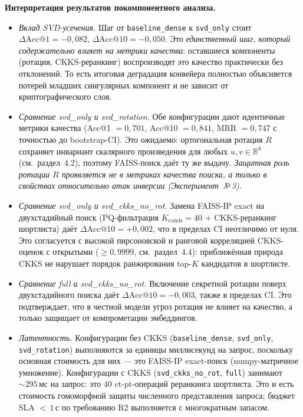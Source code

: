 \documentclass[a4paper, 12pt, oneside, openany]{article}
\begin{document}
\textbf{Интерпретация результатов покомпонентного анализа.}

\begin{itemize}
	\item \emph{Вклад SVD-усечения.} Шаг от \texttt{baseline\_dense} к \texttt{svd\_only} стоит $\Delta\mathrm{Acc@1} = -0{,}082$, $\Delta\mathrm{Acc@10} = -0{,}050$. Это \emph{единственный шаг, который содержательно влияет на метрики качества}: оставшиеся компоненты (ротация, CKKS-реранкинг) воспроизводят это качество практически без отклонений. То есть итоговая деградация конвейера полностью объясняется потерей младших сингулярных компонент и не зависит от криптографического слоя.

	\item \emph{Сравнение svd\_only и svd\_rotation.} Обе конфигурации дают идентичные метрики качества (Acc@1 $=0{,}701$, Acc@10 $=0{,}841$, MRR $=0{,}747$ с точностью до bootstrap-CI). Это ожидаемо: ортогональная ротация $R$ сохраняет инвариант скалярного произведения для любых $u, v \in \mathbb{R}^{k}$ (см.\ раздел~4.2), поэтому FAISS-поиск даёт ту же выдачу. \emph{Защитная роль ротации $R$ проявляется не в метриках качества поиска, а только в свойствах относительно атак инверсии (Эксперимент~№\,3).}

	\item \emph{Сравнение svd\_only и svd\_ckks\_no\_rot.} Замена FAISS-IP exact на двухстадийный поиск (PQ-фильтрация $K_{\mathrm{cands}} = 40$ + CKKS-реранкинг шортлиста) даёт $\Delta\mathrm{Acc@10} = +0{,}002$, что в пределах CI неотличимо от нуля. Это согласуется с высокой пирсоновской и ранговой корреляцией CKKS-оценок с открытыми ($\geq 0{,}9999$, см.\ раздел~4.4): приближённая природа CKKS не нарушает порядок ранжирования top-$K$ кандидатов в шортлисте.

	\item \emph{Сравнение full и svd\_ckks\_no\_rot.} Включение секретной ротации поверх двухстадийного поиска даёт $\Delta\mathrm{Acc@10} = -0{,}003$, также в пределах CI. Это подтверждает, что в честной модели угроз ротация не влияет на качество, а только защищает от компрометации эмбеддингов.

	\item \emph{Латентность.} Конфигурации без CKKS (\texttt{baseline\_dense}, \texttt{svd\_only}, \texttt{svd\_rotation}) выполняются за единицы миллисекунд на запрос, поскольку основная стоимость для них --- это FAISS-IP exact-поиск (numpy-матричное умножение). Конфигурации с CKKS (\texttt{svd\_ckks\_no\_rot}, \texttt{full}) занимают $\sim 295$\,мс на запрос: это 40 ct-pt-операций реранкинга шортлиста. Это и есть стоимость гомоморфной защиты численного представления запроса; бюджет SLA $<\,1$\,с по требованию R2 выполняется с многократным запасом.
\end{itemize}
\end{document}
